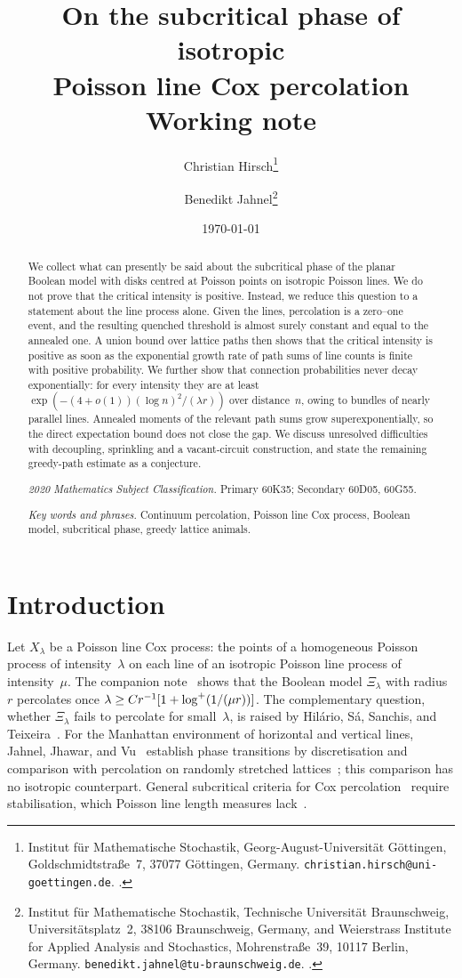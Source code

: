 \documentclass[11pt,letterpaper]{article}
\title{\textbf{On the subcritical phase of isotropic\\ Poisson line Cox percolation}\\[0.6em] \large Working note}
\author{%
  Christian Hirsch\thanks{Institut f\"ur Mathematische Stochastik, Georg-August-Universit\"at G\"ottingen, Goldschmidtstra\ss e~7, 37077 G\"ottingen, Germany. \texttt{christian.hirsch@uni-goettingen.de}. \orcid{0000-0003-4136-3740}.}
  \and
  Benedikt Jahnel\thanks{Institut f\"ur Mathematische Stochastik, Technische Universit\"at Braunschweig, Universit\"atsplatz~2, 38106 Braunschweig, Germany, and Weierstrass Institute for Applied Analysis and Stochastics, Mohrenstra\ss e~39, 10117 Berlin, Germany. \texttt{benedikt.jahnel@tu-braunschweig.de}. \orcid{0000-0002-4212-0065}.}%
}
\date{\today}
\begin{document}
\maketitle
\thispagestyle{plain}

\begin{abstract}
We collect what can presently be said about the subcritical phase of the planar Boolean model with disks centred at Poisson points on isotropic Poisson lines. We do not prove that the critical intensity is positive. Instead, we reduce this question to a statement about the line process alone. Given the lines, percolation is a zero--one event, and the resulting quenched threshold is almost surely constant and equal to the annealed one. A union bound over lattice paths then shows that the critical intensity is positive as soon as the exponential growth rate of path sums of line counts is finite with positive probability. We further show that connection probabilities never decay exponentially: for every intensity they are at least $\exp(-(4+o(1))(\log n)^2/(\lambda r))$ over distance~$n$, owing to bundles of nearly parallel lines. Annealed moments of the relevant path sums grow superexponentially, so the direct expectation bound does not close the gap. We discuss unresolved difficulties with decoupling, sprinkling and a vacant-circuit construction, and state the remaining greedy-path estimate as a conjecture.

\medskip
\noindent\textit{2020 Mathematics Subject Classification.} Primary 60K35; Secondary 60D05, 60G55.

\noindent\textit{Key words and phrases.} Continuum percolation, Poisson line Cox process, Boolean model, subcritical phase, greedy lattice animals.
\end{abstract}

\section{Introduction}
\label{sec:introduction}

Let $X_\lambda$ be a Poisson line Cox process: the points of a homogeneous Poisson process of intensity~$\lambda$ on each line of an isotropic Poisson line process of intensity~$\mu$. The companion note~\cite{HJ26} shows that the Boolean model $\Xi_\lambda$ with radius~$r$ percolates once $\lambda\ge Cr^{-1}[1+\log^{+}(1/(\mu r))]$. The complementary question, whether $\Xi_\lambda$ fails to percolate for small~$\lambda$, is raised by Hil\'ario, S\'a, Sanchis, and Teixeira~\cite[Section~9]{HSST26}. For the Manhattan environment of horizontal and vertical lines, Jahnel, Jhawar, and Vu~\cite{JJV23} establish phase transitions by discretisation and comparison with percolation on randomly stretched lattices~\cite{Hof05}; this comparison has no isotropic counterpart. General subcritical criteria for Cox percolation~\cite{HJC19} require stabilisation, which Poisson line length measures lack~\cite[Section~3]{JT22}.
\end{document}
